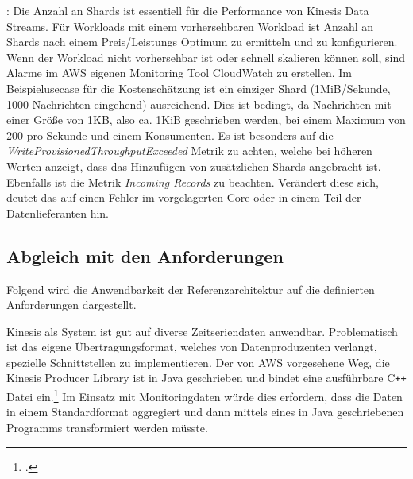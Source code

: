 : Die Anzahl an Shards ist essentiell für die Performance von Kinesis Data Streams. Für Workloads mit einem vorhersehbaren Workload ist Anzahl an Shards nach einem Preis/Leistungs Optimum zu ermitteln und zu konfigurieren. Wenn der Workload nicht vorhersehbar ist oder schnell skalieren können soll, sind Alarme im AWS eigenen Monitoring Tool CloudWatch zu erstellen. Im Beispielusecase für die Kostenschätzung ist ein einziger Shard (1MiB/Sekunde, 1000 Nachrichten eingehend) ausreichend. Dies ist bedingt, da Nachrichten mit einer Größe von 1KB, also ca. 1KiB geschrieben werden, bei einem Maximum von 200 pro Sekunde und einem Konsumenten. Es ist besonders auf die \textit{WriteProvisionedThroughputExceeded} Metrik zu achten, welche bei höheren Werten anzeigt, dass das Hinzufügen von zusätzlichen Shards angebracht ist. Ebenfalls ist die Metrik \textit{Incoming Records} zu beachten. Verändert diese sich, deutet das auf einen Fehler im vorgelagerten \AWSIOT{} Core oder in einem Teil der Datenlieferanten hin.

\subsection{Abgleich mit den Anforderungen}\label{subsection:Anforderunge-E}
Folgend wird die Anwendbarkeit der Referenzarchitektur auf die definierten Anforderungen dargestellt.

Kinesis als System ist gut auf diverse Zeitseriendaten anwendbar. Problematisch ist das eigene Übertragungsformat, welches von Datenproduzenten verlangt, spezielle Schnittstellen zu implementieren. Der von \ac{AWS} vorgesehene Weg, die Kinesis Producer Library ist in Java geschrieben und bindet eine ausführbare C\texttt{++} Datei ein.\footcite[Vgl.][]{AmazonWebServicesInc..o.J.bg} Im Einsatz mit Monitoringdaten würde dies erfordern, dass die Daten in einem Standardformat aggregiert und dann mittels eines in Java geschriebenen Programms transformiert werden müsste. 

